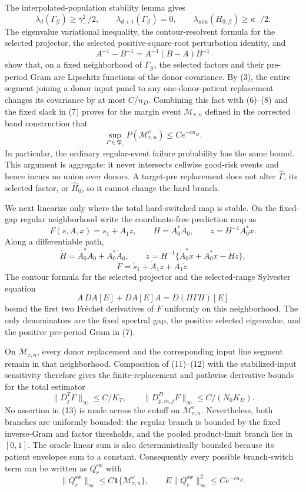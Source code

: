 The interpolated-population stability lemma gives
\[
 \lambda_d(\Gamma_{\mathcal G})\ge\gamma_-^2/2,
 \qquad \lambda_{d+1}(\Gamma_{\mathcal G})=0,
 \qquad \lambda_{\min}(H_{0,\mathcal G})\ge\kappa_-/2. \tag{7}
\]
The eigenvalue variational inequality, the contour-resolvent formula for the
selected projector, the selected positive-square-root perturbation identity,
and
\[
 A^{-1}-B^{-1}=A^{-1}(B-A)B^{-1}                        \tag{8}
\]
show that, on a fixed neighborhood of \(\Gamma_{\mathcal G}\), the selected
factors and their pre-period Gram are Lipschitz functions of the donor
covariance.  By (3), the entire segment joining a donor input panel to any
one-donor-patient replacement changes its covariance by at most \(C/n_D\).
Combining this fact with (6)--(8) and the fixed slack in (7) proves for the
margin event \(\mathcal M_{r,n}\) defined in the corrected band construction
that
\[
 \sup_{P\in\mathfrak P_r}P(\mathcal M_{r,n}^c)
 \le Ce^{-cn_D}.                                        \tag{9}
\]
In particular, the ordinary regular-event failure probability has the same
bound.  This argument is aggregate: it never intersects cellwise good-risk
events and hence incurs no union over donors.  A target-pre replacement does
not alter \(\widehat\Gamma\), its selected factor, or \(\widehat H_0\), so it
cannot change the hard branch.

We next linearize only where the total hard-switched map is stable.  On the
fixed-gap regular neighborhood write the coordinate-free prediction map as
\[
 F(s,A,x)=s_1+A_1z,
 \qquad H=A_0^*A_0,
 \qquad z=H^{-1}A_0^*x.                                 \tag{10}
\]
Along a differentiable path,
\[
 \dot H=\dot A_0^*A_0+A_0^*\dot A_0,
 \qquad
 \dot z=H^{-1}\{\dot A_0^*x+A_0^*\dot x-\dot Hz\},
\]
\[
 \dot F=\dot s_1+\dot A_1z+A_1\dot z.                 \tag{11}
\]
The contour formula for the selected projector and the selected-range
Sylvester equation
\[
 A\,DA[E]+DA[E]A=D(\Pi\Gamma\Pi)[E]                    \tag{12}
\]
bound the first two Fr\'echet derivatives of \(F\) uniformly on this
neighborhood.  The only denominators are the fixed spectral gap, the positive
selected eigenvalue, and the positive pre-period Gram in (7).

On \(\mathcal M_{r,n}\), every donor replacement and the corresponding input
line segment remain in that neighborhood.  Composition of (11)--(12) with
the stabilized-input sensitivity therefore gives the finite-replacement and
pathwise derivative bounds for the total estimator
\[
 \|D_j^T F\|_\infty\le C/K_T,
 \qquad
 \|D_{p,m,j}^D F\|_\infty\le C/(N_0K_D).               \tag{13}
\]
No assertion in (13) is made across the cutoff on
\(\mathcal M_{r,n}^c\).  Nevertheless, both branches are uniformly bounded:
the regular branch is bounded by the fixed inverse-Gram and factor thresholds,
and the pooled product-limit branch lies in \([0,1]\).  The oracle linear sum
is also deterministically bounded because its patient envelopes sum to a
constant.  Consequently every possible branch-switch term can be written as
\(Q_r^{\mathrm{sw}}\) with
\[
 \|Q_r^{\mathrm{sw}}\|_\infty
 \le C\mathbf1\{\mathcal M_{r,n}^c\},
 \qquad
 E\|Q_r^{\mathrm{sw}}\|_\infty^2\le Ce^{-cn_D}.        \tag{14}
\]

